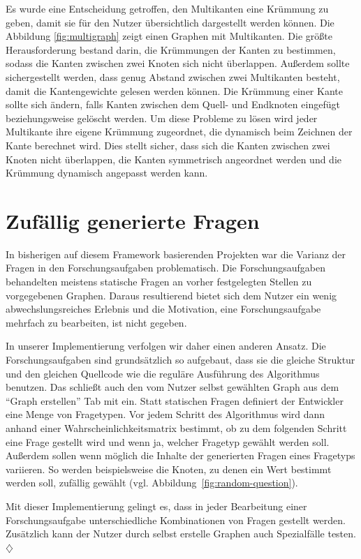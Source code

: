 Es wurde eine Entscheidung getroffen, den Multikanten eine Krümmung zu geben, damit sie für den Nutzer übersichtlich dargestellt werden können. Die Abbildung \ref{fig:multigraph} zeigt einen Graphen mit Multikanten. Die größte Herausforderung bestand darin, die Krümmungen der Kanten zu bestimmen, sodass die Kanten zwischen zwei Knoten sich nicht überlappen. Außerdem sollte sichergestellt werden, dass genug Abstand zwischen zwei Multikanten besteht, damit die Kantengewichte gelesen werden können. Die Krümmung einer Kante sollte sich ändern, falls Kanten zwischen dem Quell- und Endknoten eingefügt beziehungsweise gelöscht werden. Um diese Probleme zu lösen wird jeder Multikante ihre eigene Krümmung zugeordnet, die dynamisch beim Zeichnen der Kante berechnet wird. Dies stellt sicher, dass sich die Kanten zwischen zwei Knoten nicht überlappen, die Kanten symmetrisch angeordnet werden und die Krümmung dynamisch angepasst werden kann.

\section{Zufällig generierte Fragen} %
In bisherigen auf diesem Framework basierenden Projekten war die Varianz der Fragen in den Forschungsaufgaben problematisch. Die Forschungsaufgaben behandelten meistens statische Fragen an vorher festgelegten Stellen zu vorgegebenen Graphen. Daraus resultierend bietet sich dem Nutzer ein wenig abwechslungsreiches Erlebnis und die Motivation, eine Forschungsaufgabe mehrfach zu bearbeiten, ist nicht gegeben.

In unserer Implementierung verfolgen wir daher einen anderen Ansatz. Die Forschungsaufgaben sind grundsätzlich so aufgebaut, dass sie die gleiche Struktur und den gleichen Quellcode wie die reguläre Ausführung des Algorithmus benutzen. Das schließt auch den vom Nutzer selbst gewählten Graph aus dem \enquote{Graph erstellen} Tab mit ein. Statt statischen Fragen definiert der Entwickler eine Menge von Fragetypen. Vor jedem Schritt des Algorithmus wird dann anhand einer Wahrscheinlichkeitsmatrix bestimmt, ob zu dem folgenden Schritt eine Frage gestellt wird und wenn ja, welcher Fragetyp gewählt werden soll. Außerdem sollen wenn möglich die Inhalte der generierten Fragen eines Fragetyps variieren. So werden beispielsweise die Knoten, zu denen ein Wert bestimmt werden soll, zufällig gewählt (vgl. Abbildung~\ref{fig:random-question}).

Mit dieser Implementierung gelingt es, dass in jeder Bearbeitung einer Forschungsaufgabe unterschiedliche Kombinationen von Fragen gestellt werden. Zusätzlich kann der Nutzer durch selbst erstelle Graphen auch Spezialfälle testen. \hfill$\diamondsuit$

